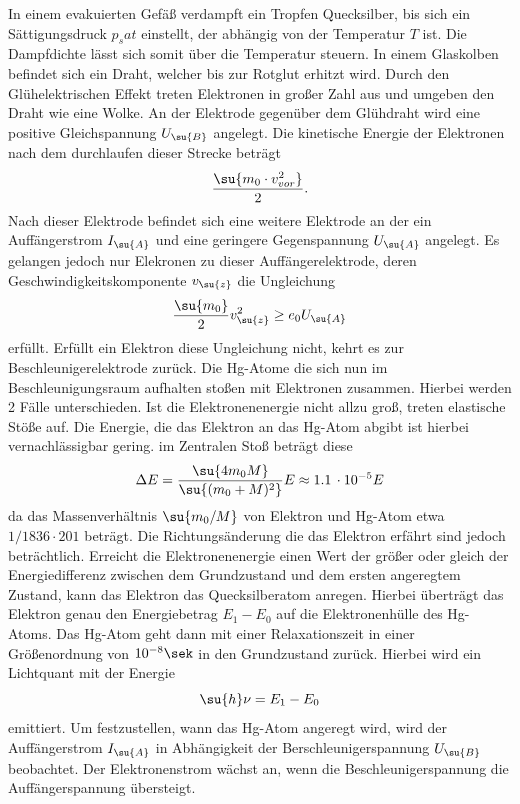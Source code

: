 In einem evakuierten Gefäß verdampft ein Tropfen Quecksilber, bis sich ein
Sättigungsdruck $p_sat$ einstellt, der abhängig von der Temperatur $T$ ist. Die
Dampfdichte lässt sich somit über die Temperatur steuern.
In einem Glaskolben befindet sich ein Draht, welcher bis zur Rotglut erhitzt
wird. Durch den Glühelektrischen Effekt treten Elektronen in großer Zahl aus und
umgeben den Draht wie eine Wolke. An der Elektrode gegenüber dem Glühdraht wird
eine positive Gleichspannung $U_\su{B}$ angelegt. Die kinetische Energie der
Elektronen nach dem durchlaufen dieser Strecke beträgt
\begin{equation}
  \frac{\su{m_0\cdot v_{vor}^2}}{2}.
  \label{Ekin}
\end{equation}
Nach dieser Elektrode befindet sich eine weitere Elektrode an der ein
Auffängerstrom $I_\su{A}$ und eine geringere Gegenspannung $U_\su{A}$ angelegt.
Es gelangen jedoch nur Elekronen zu dieser Auffängerelektrode, deren
Geschwindigkeitskomponente $v_\su{z}$ die Ungleichung
\begin{equation}
  \frac{\su{m_0}}{2}v_\su{z}^2 \geq e_0U_\su{A}
\end{equation}
erfüllt. Erfüllt ein Elektron diese Ungleichung nicht, kehrt es zur
Beschleunigerelektrode zurück. Die Hg-Atome die sich nun im Beschleunigungsraum
aufhalten stoßen mit Elektronen zusammen. Hierbei werden 2 Fälle unterschieden.
Ist die Elektronenenergie nicht allzu groß, treten elastische Stöße auf. Die
Energie, die das Elektron an das Hg-Atom abgibt ist hierbei vernachlässigbar
gering. im Zentralen Stoß beträgt diese
\begin{equation}
  \Delta E = \frac{\su{4m_0M}}{\su{(m_0+M)^2}}E\approx 1.1\,\cdot10^{-5}E
\end{equation}
da das Massenverhältnis $\su{m_0/M}$ von Elektron und Hg-Atom etwa
$1/1836\cdot201$ beträgt. Die Richtungsänderung die das Elektron erfährt sind
jedoch beträchtlich.
Erreicht die Elektronenenergie einen Wert der größer oder gleich der
Energiedifferenz zwischen dem Grundzustand und dem ersten angeregtem Zustand,
kann das Elektron das Quecksilberatom anregen. Hierbei überträgt das Elektron
genau den Energiebetrag $E_1-E_0$ auf die Elektronenhülle des Hg-Atoms.
Das Hg-Atom geht dann mit einer Relaxationszeit in einer Größenordnung von
$10^{-8}\sek$ in den Grundzustand zurück. Hierbei wird ein Lichtquant mit der
Energie
\begin{equation}
  \su{h}\nu =E_1-E_0
\end{equation}
emittiert. Um festzustellen, wann das Hg-Atom angeregt wird, wird der
Auffängerstrom $I_\su{A}$ in Abhängigkeit der Berschleunigerspannung $U_\su{B}$
beobachtet. Der Elektronenstrom wächst an, wenn die Beschleunigerspannung die
Auffängerspannung übersteigt.

